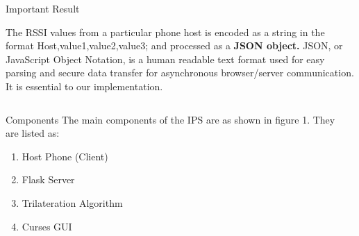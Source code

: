 \documentclass[final]{beamer}
\newlength{\onecolwid}
\newlength{\twocolwid}
\begin{document}
\begin{frame}[t]
\begin{columns}[t]
\begin{column}{\twocolwid}
\begin{alertblock}{Important Result }

The RSSI values from a particular phone host is encoded as a string in the format Host,value1,value2,value3; and processed as a \textbf{JSON object.} JSON, or JavaScript Object Notation, is a human readable text format used for easy parsing and secure data transfer for asynchronous browser/server communication. It is essential to our implementation.

\end{alertblock} 


\begin{columns}[t,totalwidth=\twocolwid] %

\begin{column}{\onecolwid} %


\begin{block}{Components}
The main components of the IPS are as shown in figure 1. They are listed as:

\begin{enumerate}
\item Host Phone (Client)
\item Flask Server 
\item Trilateration Algorithm
\item Curses GUI 
\end{enumerate}

\end{block}


\end{column} %

\begin{column}{\onecolwid} %



\end{column}
\end{columns}
\end{column}
\end{columns}
\end{frame}
\end{document}
